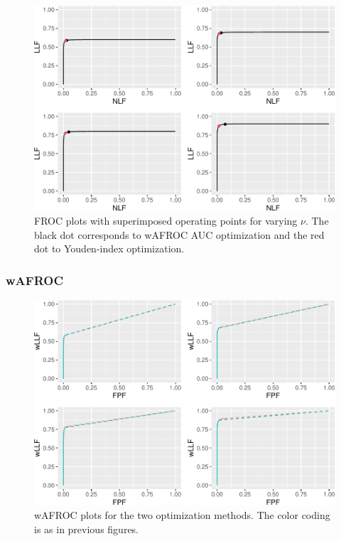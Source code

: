 \documentclass[
]{book}
\begin{document}
\begin{figure}
\centering
\includegraphics{22-optim-op-point_files/figure-latex/optim-op-point-high-performance-vary-nu-vary-all-froc-1.pdf}
\caption{\label{fig:optim-op-point-high-performance-vary-nu-vary-all-froc}FROC plots with superimposed operating points for varying \(\nu\). The black dot corresponds to wAFROC AUC optimization and the red dot to Youden-index optimization.}
\end{figure}

\hypertarget{wafroc-9}{%
\subsubsection{wAFROC}\label{wafroc-9}}

\begin{figure}
\centering
\includegraphics{22-optim-op-point_files/figure-latex/optim-op-point-high-performance-vary-nu-vary-all-wafroc-1.pdf}
\caption{\label{fig:optim-op-point-high-performance-vary-nu-vary-all-wafroc}wAFROC plots for the two optimization methods. The color coding is as in previous figures.}
\end{figure}
\end{document}
